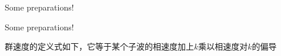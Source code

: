 \documentclass{beamer}
\begin{document}
\begin{frame}{Some preparations!}
  \begin{figure}[thpb]
    \centering
  \label{fig:system}
  \end{figure}
\end{frame}
\begin{frame}{Some preparations!}
  \par 群速度的定义式如下，它等于某个子波的相速度加上$k$乘以相速度对$k$的偏导
  \begin{figure}[thpb]
    \centering
  \label{fig:system}
  \end{figure}
\end{frame}
\end{document}
